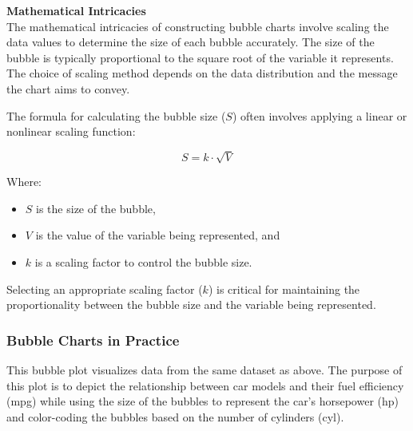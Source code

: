 \documentclass{article}\usepackage[]{graphicx}\usepackage[]{xcolor}
\begin{document}
\textbf{Mathematical Intricacies}\\
The mathematical intricacies of constructing bubble charts involve scaling the data values to determine the size of each bubble accurately. The size of the bubble is typically proportional to the square root of the variable it represents. The choice of scaling method depends on the data distribution and the message the chart aims to convey.

The formula for calculating the bubble size (\(S\)) often involves applying a linear or nonlinear scaling function:

\[
S = k \cdot \sqrt{V}
\]

Where:
\begin{itemize}
\item \(S\) is the size of the bubble,
\item \(V\) is the value of the variable being represented, and
\item \(k\) is a scaling factor to control the bubble size.
\end{itemize}

Selecting an appropriate scaling factor (\(k\)) is critical for maintaining the proportionality between the bubble size and the variable being represented.

\subsubsection{Bubble Charts in Practice}
 This bubble plot visualizes data from the same dataset as above. The purpose of this plot is to depict the relationship between car models and their fuel efficiency (mpg) while using the size of the bubbles to represent the car's horsepower (hp) and color-coding the bubbles based on the number of cylinders (cyl).
\end{document}
